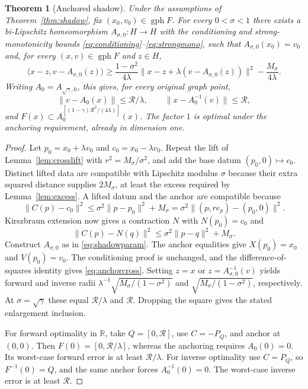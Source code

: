 \documentclass[11pt]{article}
\numberwithin{equation}{section}
\newtheorem{theorem}{Theorem}[section]
\theoremstyle{definition}
\theoremstyle{remark}
\newcommand{\R}{\mathbb R}
\newcommand{\gph}{\operatorname{gph}}
\newcommand{\rad}{\mathcal R}
\newcommand{\ip}[2]{\langle #1,#2\rangle}
\newcommand{\norm}[1]{\lVert #1\rVert}
\begin{document}
\begin{theorem}[Anchored shadow]\label{thm:anchor}
Under the assumptions of Theorem~\ref{thm:shadow}, fix
$(x_0,v_0)\in\gph F$. For every $0<\sigma<1$ there exists a bi-Lipschitz
homeomorphism $A_{\sigma,0}:H\to H$ with the conditioning and
strong-monotonicity bounds
\eqref{eq:conditioning}--\eqref{eq:strongmono}, such that
$A_{\sigma,0}(x_0)=v_0$ and, for every $(x,v)\in\gph F$ and $z\in H$,
\begin{equation}\label{eq:anchorcross}
 \ip{x-z}{v-A_{\sigma,0}(z)}
 \ge\frac{1-\sigma^2}{4\lambda}
      \norm{x-z+\lambda(v-A_{\sigma,0}(z))}^2
      -\frac{M_\sigma}{4\lambda}.
\end{equation}
Writing $A_0=A_{\sqrt\gamma,0}$, this gives, for every original graph point,
\begin{equation}\label{eq:anchorbounds}
 \norm{v-A_{0}(x)}\le\rad/\lambda,
 \qquad \norm{x-A_{0}^{-1}(v)}\le\rad,
\end{equation}
and $F(x)\subset A_0^{[(1-\gamma)\rad^2/(4\lambda)]}(x)$.
The factor $1$ is optimal under the anchoring requirement, already in
dimension one.
\end{theorem}

\begin{proof}
Let $p_0=x_0+\lambda v_0$ and $c_0=x_0-\lambda v_0$. Repeat the lift of
Lemma~\ref{lem:crosslift} with $r^2=M_\sigma/\sigma^2$, and add the base
datum $(p_0,0)\mapsto c_0$. Distinct lifted data are compatible with
Lipschitz modulus $\sigma$ because their extra squared distance supplies
$2M_\sigma$, at least the excess required by Lemma~\ref{lem:excess}.
A lifted datum and the anchor are compatible because
\[
 \norm{C(p)-c_0}^2
 \le\sigma^2\norm{p-p_0}^2+M_\sigma
 =\sigma^2\norm{(p,re_p)-(p_0,0)}^2.
\]
Kirszbraun extension now gives a contraction $N$ with $N(p_0)=c_0$ and
\[
 \norm{C(p)-N(q)}^2\le\sigma^2\norm{p-q}^2+M_\sigma.
\]
Construct $A_{\sigma,0}$ as in \eqref{eq:shadowparam}. The anchor
equalities give $X(p_0)=x_0$ and $V(p_0)=v_0$. The conditioning proof is
unchanged, and the difference-of-squares identity gives
\eqref{eq:anchorcross}. Setting $z=x$ or $z=A_{\sigma,0}^{-1}(v)$ yields
forward and inverse radii
$\lambda^{-1}\sqrt{M_\sigma/(1-\sigma^2)}$ and
$\sqrt{M_\sigma/(1-\sigma^2)}$, respectively. At
$\sigma=\sqrt\gamma$ these equal $\rad/\lambda$ and $\rad$.
Dropping the square gives the stated
enlargement inclusion.

For forward optimality in $\R$, take $Q=[0,\rad]$, use $C=-P_Q$, and
anchor at $(0,0)$. Then $F(0)=[0,\rad/\lambda]$, whereas the anchoring
requires $A_0(0)=0$. Its worst-case forward error is at least
$\rad/\lambda$. For inverse optimality use $C=P_Q$, so
$F^{-1}(0)=Q$, and the same anchor forces $A_0^{-1}(0)=0$.
The worst-case inverse error is at least $\rad$.
\end{proof}
\end{document}
